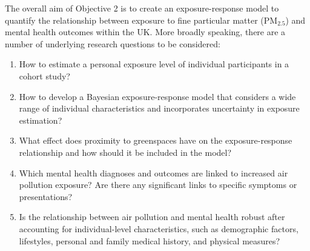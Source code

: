 The overall aim of Objective 2 is to create an exposure-response model to quantify the relationship between exposure to fine particular matter (PM$_2.5$) and mental health outcomes within the UK. More broadly speaking, there are a number of underlying research questions to be considered:
\begin{enumerate}
    \item How to estimate a personal exposure level of individual participants in a cohort study?
    \item How to develop a Bayesian exposure-response model that considers a wide range of individual characteristics and incorporates uncertainty in exposure estimation?
    \item What effect does proximity to greenspaces have on the exposure-response relationship and how should it be included in the model?
    \item Which mental health diagnoses and outcomes are linked to increased air pollution exposure? Are there any significant links to specific symptoms or presentations?
    \item Is the relationship between air pollution and mental health robust after accounting for individual-level characteristics, such as demographic factors, lifestyles, personal and family medical history, and physical measures?
\end{enumerate}


